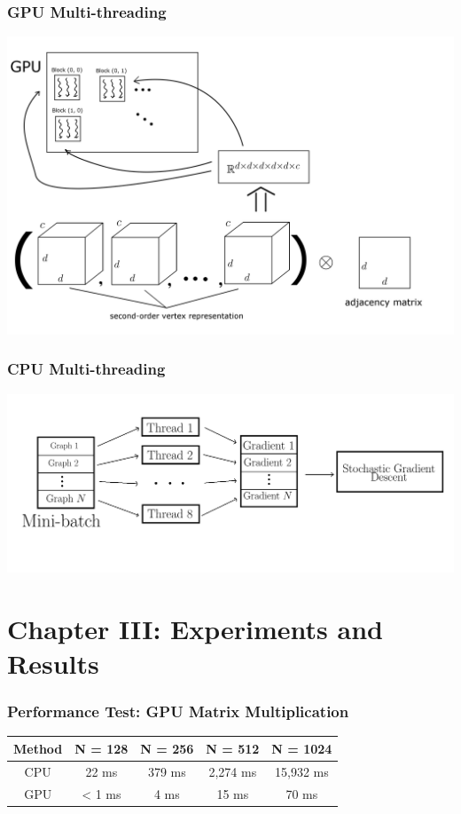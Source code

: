 \documentclass{beamer}
\begin{document}
\begin{frame}
\frametitle{GPU Multi-threading}
\includegraphics[width=\textwidth]{GPU_multithreading.png}
\end{frame}

\begin{frame}
\frametitle{CPU Multi-threading}
\includegraphics[width=\textwidth]{CPU_multithreading.png}
\end{frame}

\section{Chapter III: Experiments and Results}

\begin{frame}
\frametitle{Performance Test: GPU Matrix Multiplication}
\begin{center}
\begin{tabular}{||c | c | c | c | c ||}
	\hline
	Method & N = 128 & N = 256 & N = 512 & N = 1024 \\
	\hline\hline
	CPU & 22 ms & 379 ms & 2,274 ms & 15,932 ms \\
	\hline
	GPU & < 1 ms & 4 ms & 15 ms & 70 ms \\
	\hline
\end{tabular}
\end{center}
\end{frame}
\end{document}
